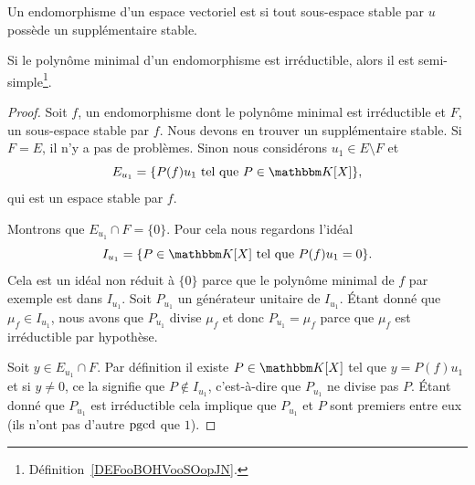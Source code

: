 \begin{definition}  \label{DEFooBOHVooSOopJN}
    Un endomorphisme d'un espace vectoriel est  si tout sous-espace stable par \( u\) possède un supplémentaire stable.
\end{definition}

\begin{lemma}   \label{LemrFINYT}
    Si le polynôme minimal d'un endomorphisme est irréductible, alors il est semi-simple\footnote{Définition~\ref{DEFooBOHVooSOopJN}.}.
\end{lemma}

\begin{proof}
    Soit \( f\), un endomorphisme dont le polynôme minimal est irréductible et \( F\), un sous-espace stable par \( f\). Nous devons en trouver un supplémentaire stable. Si \( F=E\), il n'y a pas de problèmes. Sinon nous considérons \( u_1\in E\setminus F\) et
    \begin{equation}
        E_{u_1}=\{ P(f)u_1\tq P\in \eK[X] \},
    \end{equation}
    qui est un espace stable par \( f\).

    Montrons que \( E_{u_1}\cap F=\{ 0 \}\). Pour cela nous regardons l'idéal
    \begin{equation}
        I_{u_1}=\{ P\in \eK[X]\tq P(f)u_1=0 \}.
    \end{equation}
    Cela est un idéal non réduit à \( \{ 0 \}\) parce que le polynôme minimal de \( f\) par exemple est dans \( I_{u_1}\). Soit \( P_{u_1}\) un générateur unitaire de \( I_{u_1}\). Étant donné que \( \mu_f\in I_{u_1}\), nous avons que \( P_{u_1}\) divise \( \mu_f\) et donc \( P_{u_1}=\mu_f\) parce que \( \mu_f\) est irréductible par hypothèse.

    Soit \( y\in E_{u_1}\cap F\). Par définition il existe \( P\in\eK[X]\) tel que \( y=P(f)u_1\) et si \( y\neq 0\), ce la signifie que \( P\notin I_{u_1}\), c'est-à-dire que \( P_{u_1} \) ne divise pas \( P\). Étant donné que \( P_{u_1}\) est irréductible cela implique que \( P_{u_1}\) et \( P\) sont premiers entre eux (ils n'ont pas d'autre \( \operatorname{pgcd}\) que \( 1\)).


\end{proof}
